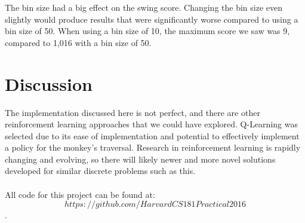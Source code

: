 \documentclass{article}
\begin{document}
The bin size had a big effect on the swing score.  Changing the bin size even slightly would produce results that were significantly worse compared to using a bin size of 50.  When using a bin size of 10, the maximum score we saw was 9, compared to 1,016 with a bin size of 50.  

\section{Discussion}
The implementation discussed here is not perfect, and there are other reinforcement learning approaches that we could have explored. Q-Learning was selected due to its ease of implementation and potential to effectively implement a policy for the monkey's traversal. Research in reinforcement learning is rapidly changing and evolving, so there will likely newer and more novel solutions developed for similar discrete problems such as this.\\\\
All code for this project can be found at: $$https://github.com/HarvardCS181Practical2016$$.
\end{document}
